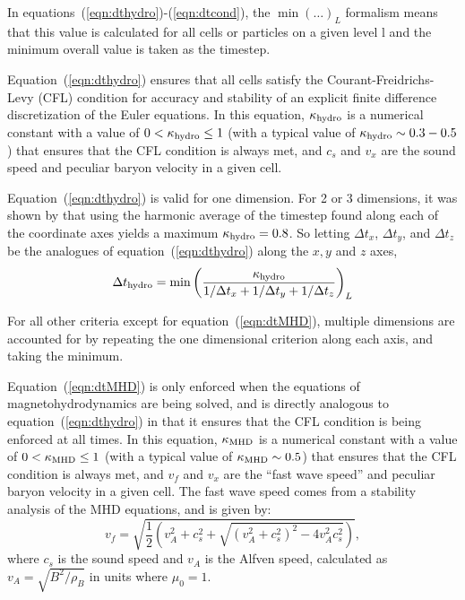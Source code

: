 
In equations~(\ref{eqn:dthydro})-(\ref{eqn:dtcond}), the $\min ( \ldots)_L$ 
formalism means that this value is calculated for all cells or
particles on a given level l and the minimum overall value is taken as the timestep.

Equation~(\ref{eqn:dthydro}) ensures that all cells satisfy the
Courant-Freidrichs-Levy (CFL) condition for accuracy and stability of
an explicit finite difference discretization of the Euler equations.
In this equation, $\kappa_{\rm hydro}$ is a
numerical constant with a value of $0 < \kappa_{\rm hydro} \leq 1$
(with a typical value of $\kappa_{\rm hydro} \sim 0.3-0.5$) that
ensures that the CFL condition is always met, and $c_s$ and $v_x$ are
the sound speed and peculiar baryon velocity in a given cell.

Equation~(\ref{eqn:dthydro}) is valid for one dimension.  For 2 or 3
dimensions, it was shown by \cite{Godunov1959}  that using the
harmonic average of the timestep found along each of the coordinate
axes yields a maximum $\kappa_{\rm hydro} = 0.8$.  So letting $\Delta
t_x$, $\Delta t_y$, and $\Delta t_z$ be the analogues of
equation~(\ref{eqn:dthydro}) along the $x,y$ and $z$ axes, 
\begin{equation}
  \Delta t_{\rm hydro} = \min \left( \frac{\kappa_{\rm hydro}} {1/\Delta t_x
  +1/\Delta t_y + 1/\Delta t_z} \right)_L
\end{equation}

For all other criteria except for equation~(\ref{eqn:dtMHD}), multiple dimensions are accounted for by
repeating the one dimensional criterion along each axis, and taking the minimum.

Equation~(\ref{eqn:dtMHD}) is only enforced when the equations of
magnetohydrodynamics are being solved, and is directly analogous to
equation~(\ref{eqn:dthydro}) in that it ensures that the CFL condition
is being enforced at all times.  In this equation, $\kappa_{\rm MHD}$ is a
numerical constant with a value of $0 < \kappa_{\rm MHD} \leq 1$ (with a
typical value of $\kappa_{\rm MHD} \sim 0.5$) that ensures that the CFL
condition is always met, and $v_f$ and $v_x$ are the ``fast wave
speed'' and peculiar baryon velocity in a given cell.  The fast wave
speed comes from a stability analysis of the MHD equations, and is
given by:
%
\begin{equation}
v_f = \sqrt{ \frac{1}{2} \left(  v_A^2 + c_s^2 + \sqrt{(v_A^2 +
      c_s^2)^2 - 4 v_A^2 c_s^2}  \right)  },
\label{eqn:vfastmhd}
\end{equation}
%
where $c_s$ is the sound speed and $v_A$ is the Alfven speed, calculated
as $v_A = \sqrt{B^2/\rho_B}$ in units where $\mu_0 = 1$.

